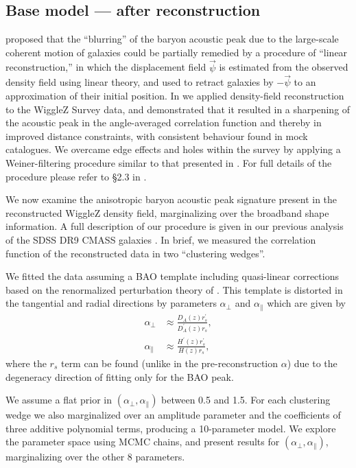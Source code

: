 \documentclass[iop,twocolappendix]{emulateapj}
\begin{document}
\subsection{Base model --- after reconstruction}

\citet{EisensteinSeoSirko2007} proposed that the ``blurring'' of the baryon
acoustic peak due to the large-scale coherent motion of galaxies could
be partially remedied by a procedure of ``linear reconstruction,'' in
which the displacement field $\vec{\psi}$ is estimated from the
observed density field using linear theory, and used to retract
galaxies by $-\vec{\psi}$ to an approximation of their initial
position.  In \citet{KazinKoda2014} we applied density-field
reconstruction to the WiggleZ Survey data, and demonstrated that it
resulted in a sharpening of the acoustic peak in the angle-averaged
correlation function and thereby in improved distance constraints,
with consistent behaviour found in mock catalogues.  We overcame edge
effects and holes within the survey by applying a Weiner-filtering
procedure similar to that presented in \citet{PadmanabhanXuEisenstein2012}.  For
full details of the procedure please refer to \S 2.3 in
\cite{KazinKoda2014}.

We now examine the anisotropic baryon acoustic peak signature present
in the reconstructed WiggleZ density field, marginalizing over the
broadband shape information.  A full description of our procedure is
given in our previous analysis of the SDSS DR9 CMASS galaxies
\citet[][see \S 5.3]{KazinSanchezCuesta2013}.  In brief, we measured the
correlation function of the reconstructed data in two ``clustering
wedges''. 

We fitted the data assuming a BAO template including
quasi-linear corrections based on the renormalized perturbation theory
of \citet{CrocceScoccimarro2008}. This template is distorted in the tangential
and radial directions by parameters $\alpha_\perp$ and
$\alpha_\parallel$ which are given by
\begin{align}
\alpha_\perp &\approx \frac{D_A(z) r^\prime_s }{D_A^{\prime}(z) r_s}, \label{eq:alphaperp}\\
\alpha_\parallel &\approx \frac{H^{\prime}(z) r^\prime_s}{H(z) r_s},\label{eq:alphaparallel}
\end{align}
where the $r_s$ term can be found (unlike in the pre-reconstruction $\alpha$) due to the degeneracy direction of fitting only for the BAO peak.

  


We assume a flat prior in $(\alpha_\perp,\alpha_\parallel)$ between
0.5 and 1.5.  For each clustering wedge we also marginalized over an
amplitude parameter and the coefficients of three additive polynomial
terms, producing a 10-parameter model.  We explore the parameter space
using MCMC chains, and present results for
$(\alpha_\perp,\alpha_\parallel)$, marginalizing over the other 8
parameters.
\end{document}
